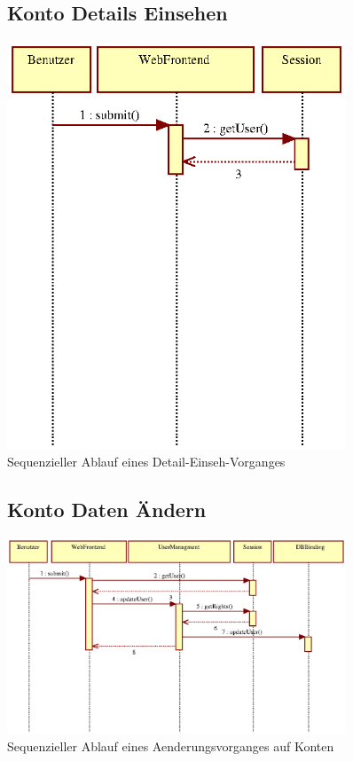 \documentclass[a4paper,11pt]{scrartcl}
\begin{document}
\begin{figure}[h]
\subsection{Konto Details Einsehen}
		\centering
		\includegraphics[width=0.90\textwidth]{images/seq05_KontoDetailsEinsehen.eps}
		\caption{Sequenzieller Ablauf eines Detail-Einseh-Vorganges}
		\label{seq05}
\end{figure}


\begin{figure}[h]
\subsection{Konto Daten Ändern}
		\centering
		\includegraphics[width=0.90\textwidth]{images/seq06_KontoDatenAendern.eps}
		\caption{Sequenzieller Ablauf eines Aenderungsvorganges auf Konten}
		\label{seq06}
\end{figure}
\end{document}
